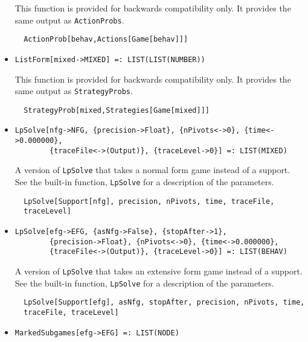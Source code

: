 \begin{itemize}
\bd 
This function is provided for backwards compatibility only.  It
provides the same output as \verb+ActionProbs+.
\begin{verbatim}
  ActionProb[behav,Actions[Game[behav]]]
\end{verbatim} 
\ed

\item{}
\protect \large \begin{verbatim}
ListForm[mixed->MIXED] =: LIST(LIST(NUMBER)) 
\end{verbatim}\normalsize

\bd 
This function is provided for backwards compatibility only.  It
provides the same output as \verb+StrategyProbs+.
\begin{verbatim}
  StrategyProb[mixed,Strategies[Game[mixed]]]
\end{verbatim} 
\ed

\item{}
\protect \large \begin{verbatim}
LpSolve[nfg->NFG, {precision->Float}, {nPivots<->0}, {time<->0.000000}, 
        {traceFile<->(Output)}, {traceLevel->0}] =: LIST(MIXED) 
\end{verbatim}\normalsize

\bd 
A version of \verb+LpSolve+ that takes a normal form
game instead of a support.  See the built-in function,
\verb+LpSolve+ for a description of the parameters.
\begin{verbatim}
  LpSolve[Support[nfg], precision, nPivots, time, traceFile, 
  traceLevel]
\end{verbatim} 
\ed

\item{}
\protect \large \begin{verbatim}
LpSolve[efg->EFG, {asNfg->False}, {stopAfter->1},
        {precision->Float}, {nPivots<->0}, {time<->0.000000}, 
        {traceFile<->(Output)}, {traceLevel->0}] =: LIST(BEHAV) 
\end{verbatim}\normalsize

\bd 
A version of \verb+LpSolve+ that takes an extensive form
game instead of a support.  See the built-in function,
\verb+LpSolve+ for a description of the parameters.
\begin{verbatim}
  LpSolve[Support[efg], asNfg, stopAfter, precision, nPivots, time, 
  traceFile, traceLevel]
\end{verbatim} 
\ed


\item{}
\protect \large \begin{verbatim}
MarkedSubgames[efg->EFG] =: LIST(NODE) 
\end{verbatim}\normalsize


\end{itemize}
